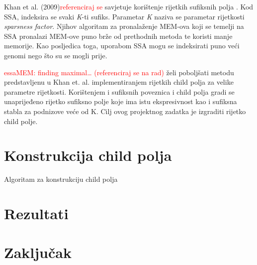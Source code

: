 \documentclass[times, utf8, seminar, numeric]{fer}
\newcommand\todo[1]{\textcolor{red}{#1}}
\begin{document}
Khan et al. (2009)\todo{referenciraj se} savjetuje korištenje rijetkih sufiksnih polja . Kod SSA, indeksira se svaki \textit{K}-ti sufiks. Parametar \textit{K} naziva se parametar rijetkosti \textit{sparsness factor}. Njihov algoritam za pronalaženje MEM-ova koji se temelji na SSA pronalazi MEM-ove puno brže od prethodnih metoda te koristi manje memorije. Kao posljedica toga, uporabom SSA mogu se indeksirati puno veći genomi nego što su se mogli prije.

\todo{essaMEM: finding maximal… (referenciraj se na rad)} želi poboljšati metodu predstavljenu u Khan et. al. implementiranjem rijetkih child polja za velike parametre rijetkosti. Korištenjem i sufiksnih poveznica  i child polja gradi se unaprijeđeno rijetko sufiksno polje  koje ima istu ekspresivnost kao i sufiksna stabla za podnizove veće od K. Cilj ovog projektnog zadatka je izgraditi rijetko child polje.

\chapter{Konstrukcija child polja}

\begin{algorithm}[h]
	\caption{Algoritam za konstrukciju child polja}
	\label{alg:child-array}

	
	
	
\end{algorithm}

\chapter{Rezultati}

\chapter{Zaključak}




\begin{sazetak}


\end{sazetak}
\end{document}
